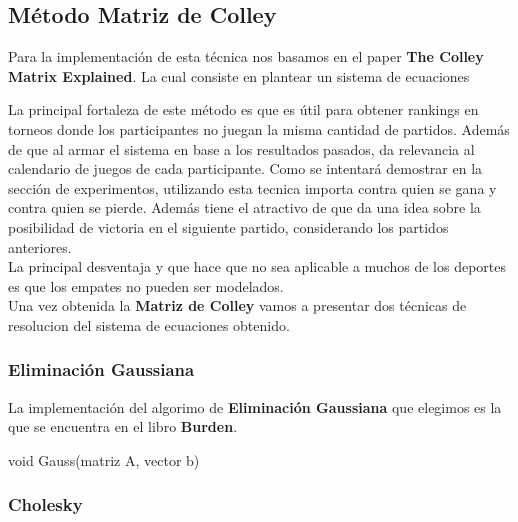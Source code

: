 \subsection{Método Matriz de Colley}

Para la implementación de esta técnica nos basamos en el paper \textbf{The Colley Matrix Explained}. La cual consiste en plantear un sistema de ecuaciones

La principal fortaleza de este método es que es útil para obtener rankings en torneos donde los participantes no juegan la misma cantidad de partidos. Además de que al armar el sistema en base a los resultados pasados, da relevancia al calendario de juegos de cada participante. Como se intentará demostrar en la sección de experimentos, utilizando esta tecnica importa contra quien se gana y contra quien se pierde. Además tiene el atractivo de que da una idea sobre la posibilidad de victoria en el siguiente partido, considerando los partidos anteriores. \\

La principal desventaja y que hace que no sea aplicable a muchos de los deportes es que los empates no pueden ser modelados. \\

Una vez obtenida la \textbf{Matriz de Colley} vamos a  presentar dos técnicas de resolucion del sistema de ecuaciones obtenido. \\

\subsubsection{Eliminación Gaussiana}

La implementación del algorimo de \textbf{Eliminación Gaussiana} que elegimos es la que se encuentra en el libro \textbf{Burden}. \\


\begin{algorithm}
\begin{algorithmic}[1]\parskip=1mm
\caption{void Gauss(matriz A, vector b)}
\end{algorithmic}
\end{algorithm}


\subsubsection{Cholesky}

